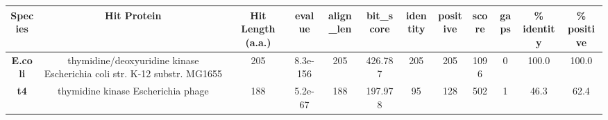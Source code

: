\begin{tabular}{|c|c|c|c|c|c|c|c|c|c|c|c|} \hline
\textbf{Species} & \textbf{Hit Protein} & \textbf{Hit Length (a.a.)} & \textbf{evalue} & \textbf{align\_len} & \textbf{bit\_score} & \textbf{identity} & \textbf{positive} & \textbf{score} & \textbf{gaps} & \textbf{\% identity} & \textbf{\% positive} \\ \hline
\textbf{E.coli} & thymidine/deoxyuridine kinase Escherichia coli str. K-12 substr. MG1655 & 205 & 8.3e-156 & 205 & 426.787 & 205 & 205 & 1096 & 0 & 100.0 & 100.0\\
\textbf{t4} & thymidine kinase Escherichia phage  & 188 & 5.2e-67 & 188 & 197.978 & 95 & 128 & 502 & 1 & 46.3 & 62.4\\
\hline \end{tabular}
